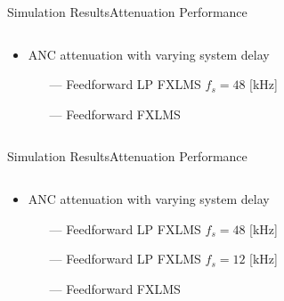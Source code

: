\begin{frame}{Simulation Results}{Attenuation Performance}		
\begin{columns}
	\begin{column}{0.4\textwidth}
	\begin{itemize}
		\item ANC attenuation with varying system delay
		\begin{itemize}
				\item[\textcolor{MATLABorange}{---}] Feedforward LP FXLMS $f_s= 48$ [kHz] 
				\item[\textcolor{MATLABblue}{---}] Feedforward FXLMS 
		\end{itemize}
	\end{itemize}
	\end{column}
	\begin{column}{0.6\textwidth} 
		\resizebox{0.9\columnwidth}{!}{		
			}
	\end{column}
\end{columns}
\end{frame}





\begin{frame}{Simulation Results}{Attenuation Performance}		
\begin{columns}
	\begin{column}{0.4\textwidth}
	\begin{itemize}
		\item ANC attenuation with varying system delay
		\begin{itemize}
				\item[\textcolor{MATLABorange}{---}] Feedforward LP FXLMS $f_s= 48$ [kHz] 
				\item[\textcolor{MATLABpurple}{---}] Feedforward LP FXLMS $f_s= 12$ [kHz] 
				\item[\textcolor{MATLABblue}{---}] Feedforward FXLMS 
		\end{itemize}
	\end{itemize}
	\end{column}
	\begin{column}{0.6\textwidth} 
		\resizebox{0.9\columnwidth}{!}{		
			}
	\end{column}
\end{columns}
\end{frame}






